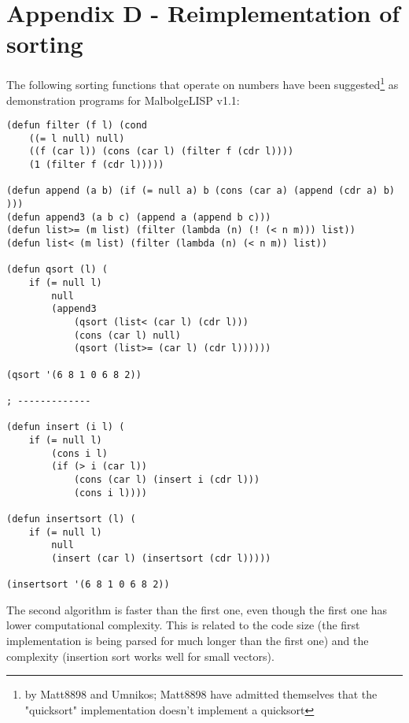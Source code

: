 
\chapter*{Appendix D - Reimplementation of sorting}

\par The following sorting functions that operate on numbers have been suggested\footnote{by Matt8898 and Umnikos; Matt8898 have admitted themselves that the "quicksort" implementation doesn't implement a quicksort} as demonstration programs for MalbolgeLISP v1.1:

\begin{verbatim}
(defun filter (f l) (cond
    ((= l null) null)
    ((f (car l)) (cons (car l) (filter f (cdr l))))
    (1 (filter f (cdr l)))))

(defun append (a b) (if (= null a) b (cons (car a) (append (cdr a) b) )))
(defun append3 (a b c) (append a (append b c)))
(defun list>= (m list) (filter (lambda (n) (! (< n m))) list))
(defun list< (m list) (filter (lambda (n) (< n m)) list))

(defun qsort (l) (
    if (= null l)
        null
        (append3
            (qsort (list< (car l) (cdr l)))
            (cons (car l) null)
            (qsort (list>= (car l) (cdr l))))))

(qsort '(6 8 1 0 6 8 2))

; -------------

(defun insert (i l) (
    if (= null l)
        (cons i l)
        (if (> i (car l))
            (cons (car l) (insert i (cdr l)))
            (cons i l))))

(defun insertsort (l) (
    if (= null l)
        null
        (insert (car l) (insertsort (cdr l)))))

(insertsort '(6 8 1 0 6 8 2))
\end{verbatim}

\par The second algorithm is faster than the first one, even though the first one has lower computational complexity. This is related to the code size (the first implementation is being parsed for much longer than the first one) and the complexity (insertion sort works well for small vectors).
